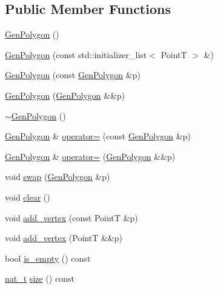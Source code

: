 \subsection*{Public Member Functions}
\begin{DoxyCompactItemize}
\item 
\hyperlink{class_designar_1_1_gen_polygon_a309794dce5861b9f5c158ea48a01be3e}{Gen\+Polygon} ()
\item 
\hyperlink{class_designar_1_1_gen_polygon_ac5ac34d76225f9c1d8895753f9e22ae8}{Gen\+Polygon} (const std\+::initializer\+\_\+list$<$ PointT $>$ \&)
\item 
\hyperlink{class_designar_1_1_gen_polygon_a8dd52177ce8635fb198a12cc62bdb44f}{Gen\+Polygon} (const \hyperlink{class_designar_1_1_gen_polygon}{Gen\+Polygon} \&p)
\item 
\hyperlink{class_designar_1_1_gen_polygon_af8cd6e919aacfbefd4d719f3c4d66623}{Gen\+Polygon} (\hyperlink{class_designar_1_1_gen_polygon}{Gen\+Polygon} \&\&p)
\item 
\hyperlink{class_designar_1_1_gen_polygon_ad23629fffafdf4f9c01a2db01e5cec9a}{$\sim$\+Gen\+Polygon} ()
\item 
\hyperlink{class_designar_1_1_gen_polygon}{Gen\+Polygon} \& \hyperlink{class_designar_1_1_gen_polygon_a83919ff0fa706a813d2d3bdebc4d644b}{operator=} (const \hyperlink{class_designar_1_1_gen_polygon}{Gen\+Polygon} \&p)
\item 
\hyperlink{class_designar_1_1_gen_polygon}{Gen\+Polygon} \& \hyperlink{class_designar_1_1_gen_polygon_ab38a83d2d3f9e9ab74d150a3def73ba3}{operator=} (\hyperlink{class_designar_1_1_gen_polygon}{Gen\+Polygon} \&\&p)
\item 
void \hyperlink{class_designar_1_1_gen_polygon_ac3c88479623a86d9f49c24676f837c0d}{swap} (\hyperlink{class_designar_1_1_gen_polygon}{Gen\+Polygon} \&p)
\item 
void \hyperlink{class_designar_1_1_gen_polygon_a1f16b49e951787ee8afff43ae1957a8b}{clear} ()
\item 
void \hyperlink{class_designar_1_1_gen_polygon_a3e059181e8c356f814bdf298da82f305}{add\+\_\+vertex} (const PointT \&p)
\item 
void \hyperlink{class_designar_1_1_gen_polygon_a0236ff66d05f2340c9412d5a6f5dc813}{add\+\_\+vertex} (PointT \&\&p)
\item 
bool \hyperlink{class_designar_1_1_gen_polygon_a71494c73881d1281048a24d4d75b67f1}{is\+\_\+empty} () const
\item 
\hyperlink{namespace_designar_aa72662848b9f4815e7bf31a7cf3e33d1}{nat\+\_\+t} \hyperlink{class_designar_1_1_gen_polygon_a7e39723b98f9fd7dabe41de58cf29575}{size} () const

\end{DoxyCompactItemize}

